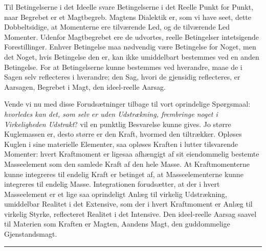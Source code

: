 \documentclass[12pt,a4paper]{book}
\newcommand{\streg}{\begin{center}\rule{2cm}{0.4pt}\end{center}}
\begin{document}
Til Betingelserne i det Ideelle svare Betingelserne i det Reelle Punkt
for Punkt, naar Begrebet er et Magtbegreb. Magtens Dialektik er, som
vi have seet, dette Dobbeltsidige, at Momenterne ere tilværende Led, og
de tilværende Led Momenter. Udenfor Magtbegrebet ere de udvortes,
reelle Betingelser intetsigende Forestillinger. Enhver Betingelse maa
nødvendig være Betingelse for Noget, men det Noget, hvis Betingelse den
er, kan ikke umiddelbart bestemmes ved en anden Betingelse. For at
Betingelserne kunne bestemmes ved hverandre, maae de i Sagen selv
reflecteres i hverandre; den Sag, hvori de gjensidig reflecteres, er
Aarsagen, Begrebet i Magt, den ideel-reelle Aarsag.

Vende vi nu med disse Forudsætninger tilbage til vort oprindelige
Spørgsmaal: \emph{hvorledes kan det, som selv er uden Udstrækning,
frembringe noget i Virkeligheden Udstrakt}? vil en punktlig Besvarelse
kunne gives. Jo større Kuglemassen er, desto større er den Kraft,
hvormed den tiltrækker. Opløses Kuglen i sine materielle Elementer, saa
opløses Kraften i lutter tilsvarende Momenter: hvert Kraftmoment er
ligesaa afhængigt af sit eiendommelig bestemte Masseelement som den
samlede Kraft af den hele Masse. At Kraftmomenterne kunne integreres til
endelig Kraft er betinget af, at Masseelementerne kunne integreres til
endelig Masse. Integrationen forudsætter, at der i hvert Masseelement er
et lige saa oprindeligt Anlæg til virkelig Udstrækning, umiddelbar
Realitet i det Extensive, som der i hvert Kraftmoment er Anlæg til
virkelig Styrke, reflecteret Realitet i det Intensive. Den ideel-reelle
Aarsag saavel til Materien som Kraften er Magten, Aandens Magt, den
guddommelige Gjenstandsmagt.

\streg
\end{document}
